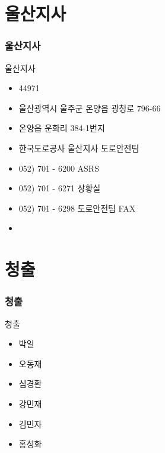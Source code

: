 \documentclass[aspectratio=1610,20pt,xcolor=pdftex,dvipsnames,table,handout]{beamer}
\begin{document}
		\section{울산지사}
		\begin{frame} [t,plain]
		\frametitle{울산지사}
			\begin{block} {울산지사}
			\setlength{\leftmargini}{2em}			
			\begin{itemize}
				\item 44971
				\item 울산광역시 울주군 온양읍 광청로 796-66
				\item 온양읍 운화리 384-1번지
				\item 한국도로공사 울산지사 도로안전팀
				\item 052) 701 - 6200 ASRS
				\item 052) 701 - 6271 상황실
				\item 052) 701 - 6298 도로안전팀 FAX
				\item 				\hrulefill

			\end{itemize}
			\end{block}						

		\end{frame}						
		

		\section{청출}
		\begin{frame} [t,plain]
		\frametitle{청출}
			\begin{block} {청출}
			\setlength{\leftmargini}{1em}			
			\begin{itemize}
				\item 박일 \quad \hrulefill
				\item 오동재		\quad \hrulefill
				\item 심경환		\quad \hrulefill
				\item 강민재		\quad \hrulefill
				\item 김민자		\quad \hrulefill
				\item 홍성화		\quad \hrulefill

			\end{itemize}
			\end{block}			

								
		\end{frame}						
	
\end{document}
